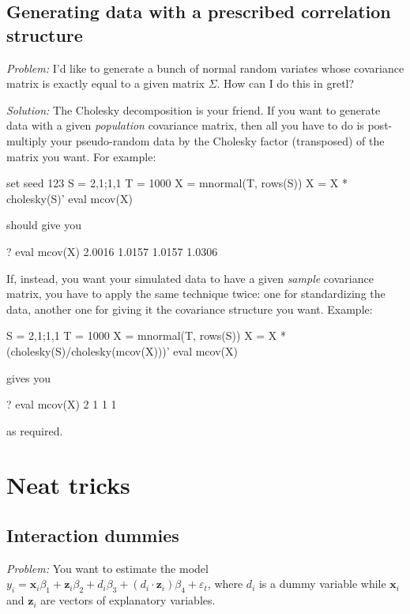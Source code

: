 \subsection{Generating data with a prescribed correlation structure}
\label{sec:CholeskyTrick}

\emph{Problem:} I'd like to generate a bunch of normal random variates
whose covariance matrix is exactly equal to a given matrix
$\Sigma$. How can I do this in gretl?

\emph{Solution:} The Cholesky decomposition is your friend. If you
want to generate data with a given \emph{population} covariance
matrix, then all you have to do is post-multiply your pseudo-random
data by the Cholesky factor (transposed) of the matrix you want. For
example:
\begin{code}
set seed 123
S = {2,1;1,1}
T = 1000
X = mnormal(T, rows(S))
X = X * cholesky(S)'
eval mcov(X)
\end{code}
should give you
\begin{code}
? eval mcov(X)
      2.0016       1.0157
      1.0157       1.0306
\end{code}

If, instead, you want your simulated data to have a given \emph{sample}
covariance matrix, you have to apply the same technique twice: one for
standardizing the data, another one for giving it the covariance
structure you want. Example:
\begin{code}
S = {2,1;1,1}
T = 1000
X = mnormal(T, rows(S))
X = X * (cholesky(S)/cholesky(mcov(X)))'
eval mcov(X)
\end{code}
gives you
\begin{code}
? eval mcov(X)
   2   1
   1   1
\end{code}
as required.

\section{Neat tricks}
\label{sec:cheat-neat}

\subsection{Interaction dummies}

\emph{Problem:} You want to estimate the model $y_i = \mathbf{x}_i
\beta_1 + \mathbf{z}_i \beta_2 + d_i \beta_3 + (d_i \cdot \mathbf{z}_i)
\beta_4 + \varepsilon_t$, where $d_i$ is a dummy variable while
$\mathbf{x}_i$ and $\mathbf{z}_i$ are vectors of explanatory
variables.

